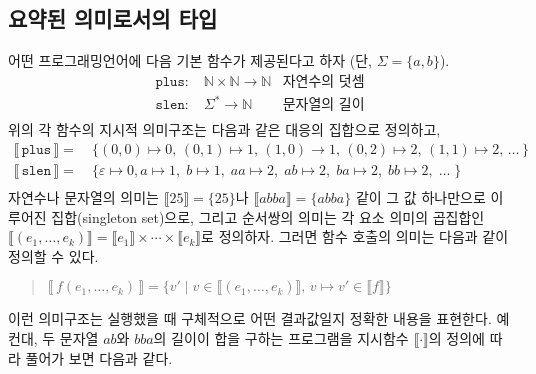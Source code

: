 \subsection{요약된 의미로서의 타입}
어떤 프로그래밍언어에 다음 기본 함수가 제공된다고 하자 (단, $\Sigma=\{a,b\}$).
\vspace{-1.5ex}
\begin{align*}
\texttt{plus} :\; & \mathbb{N} \times \mathbb{N} \to \mathbb{N} & \text{자연수의 덧셈}\\
\texttt{slen} :\; & \Sigma^{*} \to \mathbb{N} & \text{문자열의 길이}\\[-5.5ex]
\end{align*}
위의 각 함수의 지시적 의미구조는 다음과 같은 대응의 집합으로 정의하고,\vspace*{-1.5ex}
\begin{align*}
 \llbracket\,\texttt{plus}\,\rrbracket
 =~& \{ (0,0)\mapsto 0,\,
        (0,1)\mapsto 1,\,(1,0)\to 1,\,
        (0,2)\mapsto 2,\,(1,1)\mapsto 2,\,
        \ldots\,
     \}
 \\
 \llbracket\,\texttt{slen}\,\rrbracket
 =~& \{ \varepsilon\mapsto 0, 
        a\mapsto 1,\;b\mapsto 1,\;
        aa\mapsto 2,\;ab\mapsto 2,\;ba\mapsto 2,\;bb\mapsto 2,\;
        \ldots\;
     \} \\[-5.5ex]
\end{align*}
자연수나 문자열의 의미는
$\llbracket 25 \rrbracket = \{25\}$나 $\llbracket abba \rrbracket = \{abba\}$ 같이
그 값 하나만으로 이루어진 집합(singleton set)으로, 그리고 순서쌍의 의미는
각 요소 의미의 곱집합인
$\llbracket(e_1,\ldots,e_k)\rrbracket =
 \llbracket e_1\rrbracket\times\cdots\times\llbracket e_k\rrbracket$로 정의하자.
그러면 함수 호출의 의미는 다음과 같이 정의할 수 있다.\vspace*{-1ex}
\begin{quote}
$ \llbracket\,f(e_1,\ldots,e_k)\,\rrbracket
 = \{ v' \mid v \in \llbracket (e_1,\ldots,e_k)\rrbracket,\,
              v\mapsto v' \in \llbracket f\rrbracket \} $
\end{quote}
이런 의미구조는 실행했을 때 구체적으로 어떤 결과값일지 정확한 내용을
표현한다. 예컨대, 두 문자열 $ab$와 $bba$의 길이이 합을 구하는 프로그램을
지시함수 $\llbracket\cdot\rrbracket$의 정의에 따라 풀어가 보면 다음과 같다.
\vspace*{-1.5ex}
